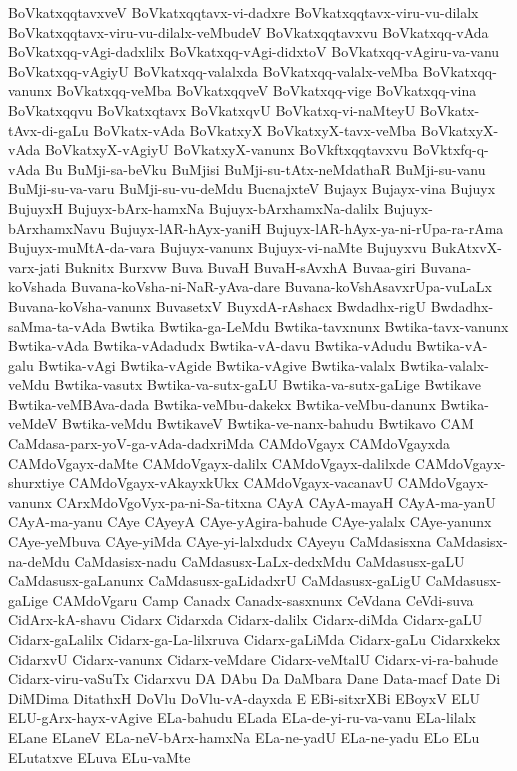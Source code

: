 {BoVkatxqqtavxveV
BoVkatxqqtavx-vi-dadxre
BoVkatxqqtavx-viru-vu-dilalx
BoVkatxqqtavx-viru-vu-dilalx-veMbudeV
BoVkatxqqtavxvu
BoVkatxqq-vAda
BoVkatxqq-vAgi-dadxlilx
BoVkatxqq-vAgi-didxtoV
BoVkatxqq-vAgiru-va-vanu
BoVkatxqq-vAgiyU
BoVkatxqq-valalxda
BoVkatxqq-valalx-veMba
BoVkatxqq-vanunx
BoVkatxqq-veMba
BoVkatxqqveV
BoVkatxqq-vige
BoVkatxqq-vina
BoVkatxqqvu
BoVkatxqtavx
BoVkatxqvU
BoVkatxq-vi-naMteyU
BoVkatx-tAvx-di-gaLu
BoVkatx-vAda
BoVkatxyX
BoVkatxyX-tavx-veMba
BoVkatxyX-vAda
BoVkatxyX-vAgiyU
BoVkatxyX-vanunx
BoVkftxqqtavxvu
BoVktxfq-q-vAda
Bu
BuMji-sa-beVku
BuMjisi
BuMji-su-tAtx-neMdathaR
BuMji-su-vanu
BuMji-su-va-varu
BuMji-su-vu-deMdu
BucnajxteV
Bujayx
Bujayx-vina
Bujuyx
BujuyxH
Bujuyx-bArx-hamxNa
Bujuyx-bArxhamxNa-dalilx
Bujuyx-bArxhamxNavu
Bujuyx-lAR-hAyx-yaniH
Bujuyx-lAR-hAyx-ya-ni-rUpa-ra-rAma
Bujuyx-muMtA-da-vara
Bujuyx-vanunx
Bujuyx-vi-naMte
Bujuyxvu
BukAtxvX-varx-jati
Buknitx
Burxvw
Buva
BuvaH
BuvaH-sAvxhA
Buvaa-giri
Buvana-koVshada
Buvana-koVsha-ni-NaR-yAva-dare
Buvana-koVshAsavxrUpa-vuLaLx
Buvana-koVsha-vanunx
BuvasetxV
BuyxdA-rAshacx
Bwdadhx-rigU
Bwdadhx-saMma-ta-vAda
Bwtika
Bwtika-ga-LeMdu
Bwtika-tavxnunx
Bwtika-tavx-vanunx
Bwtika-vAda
Bwtika-vAdadudx
Bwtika-vA-davu
Bwtika-vAdudu
Bwtika-vA-galu
Bwtika-vAgi
Bwtika-vAgide
Bwtika-vAgive
Bwtika-valalx
Bwtika-valalx-veMdu
Bwtika-vasutx
Bwtika-va-sutx-gaLU
Bwtika-va-sutx-gaLige
Bwtikave
Bwtika-veMBAva-dada
Bwtika-veMbu-dakekx
Bwtika-veMbu-danunx
Bwtika-veMdeV
Bwtika-veMdu
BwtikaveV
Bwtika-ve-nanx-bahudu
Bwtikavo
CAM
CaMdasa-parx-yoV-ga-vAda-dadxriMda
CAMdoVgayx
CAMdoVgayxda
CAMdoVgayx-daMte
CAMdoVgayx-dalilx
CAMdoVgayx-dalilxde
CAMdoVgayx-shurxtiye
CAMdoVgayx-vAkayxkUkx
CAMdoVgayx-vacanavU
CAMdoVgayx-vanunx
CArxMdoVgoVyx-pa-ni-Sa-titxna
CAyA
CAyA-mayaH
CAyA-ma-yanU
CAyA-ma-yanu
CAye
CAyeyA
CAye-yAgira-bahude
CAye-yalalx
CAye-yanunx
CAye-yeMbuva
CAye-yiMda
CAye-yi-lalxdudx
CAyeyu
CaMdasisxna
CaMdasisx-na-deMdu
CaMdasisx-nadu
CaMdasusx-LaLx-dedxMdu
CaMdasusx-gaLU
CaMdasusx-gaLanunx
CaMdasusx-gaLidadxrU
CaMdasusx-gaLigU
CaMdasusx-gaLige
CAMdoVgaru
Camp
Canadx
Canadx-sasxnunx
CeVdana
CeVdi-suva
CidArx-kA-shavu
Cidarx
Cidarxda
Cidarx-dalilx
Cidarx-diMda
Cidarx-gaLU
Cidarx-gaLalilx
Cidarx-ga-La-lilxruva
Cidarx-gaLiMda
Cidarx-gaLu
Cidarxkekx
CidarxvU
Cidarx-vanunx
Cidarx-veMdare
Cidarx-veMtalU
Cidarx-vi-ra-bahude
Cidarx-viru-vaSuTx
Cidarxvu
DA
DAbu
Da
DaMbara
Dane
Data-macf
Date
Di
DiMDima
DitathxH
DoVlu
DoVlu-vA-dayxda
E
EBi-sitxrXBi
EBoyxV
ELU
ELU-gArx-hayx-vAgive
ELa-bahudu
ELada
ELa-de-yi-ru-va-vanu
ELa-lilalx
ELane
ELaneV
ELa-neV-bArx-hamxNa
ELa-ne-yadU
ELa-ne-yadu
ELo
ELu
ELutatxve
ELuva
ELu-vaMte
}
